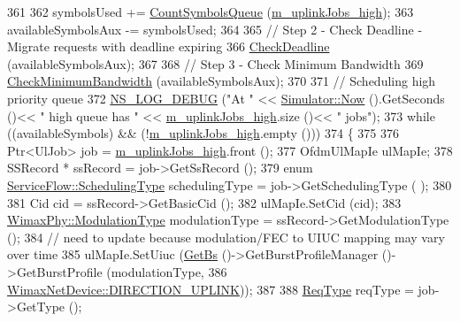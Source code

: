 \begin{DoxyCode}
361 
362   symbolsUsed += \hyperlink{classns3_1_1UplinkSchedulerMBQoS_a31659c6f3996b4a820235a4359ab2a5e}{CountSymbolsQueue} (\hyperlink{classns3_1_1UplinkSchedulerMBQoS_acb8b5539e366b4942381b08edccfba4b}{m\_uplinkJobs\_high});
363   availableSymbolsAux -= symbolsUsed;
364 
365   \textcolor{comment}{// Step 2 - Check Deadline - Migrate requests with deadline expiring}
366   \hyperlink{classns3_1_1UplinkSchedulerMBQoS_a3f8e2b0a22540ea61354cf4147187399}{CheckDeadline} (availableSymbolsAux);
367 
368   \textcolor{comment}{// Step 3 - Check Minimum Bandwidth}
369   \hyperlink{classns3_1_1UplinkSchedulerMBQoS_ae25c9cfb244144f5f9e2b7393253d009}{CheckMinimumBandwidth} (availableSymbolsAux);
370 
371   \textcolor{comment}{// Scheduling high priority queue}
372   \hyperlink{group__logging_ga413f1886406d49f59a6a0a89b77b4d0a}{NS\_LOG\_DEBUG} (\textcolor{stringliteral}{"At "} << \hyperlink{classns3_1_1Simulator_ac3178fa975b419f7875e7105be122800}{Simulator::Now} ().GetSeconds ()<< \textcolor{stringliteral}{" high queue has "} << 
      \hyperlink{classns3_1_1UplinkSchedulerMBQoS_acb8b5539e366b4942381b08edccfba4b}{m\_uplinkJobs\_high}.size ()<< \textcolor{stringliteral}{" jobs"});
373   \textcolor{keywordflow}{while} ((availableSymbols) && (!\hyperlink{classns3_1_1UplinkSchedulerMBQoS_acb8b5539e366b4942381b08edccfba4b}{m\_uplinkJobs\_high}.empty ()))
374     \{
375 
376       Ptr<UlJob> job = \hyperlink{classns3_1_1UplinkSchedulerMBQoS_acb8b5539e366b4942381b08edccfba4b}{m\_uplinkJobs\_high}.front ();
377       OfdmUlMapIe ulMapIe;
378       SSRecord * ssRecord = job->GetSsRecord ();
379       \textcolor{keyword}{enum} \hyperlink{classns3_1_1ServiceFlow_a7990ba10be1e098328fd1e6382a26235}{ServiceFlow::SchedulingType} schedulingType = job->GetSchedulingType (
      );
380 
381       Cid cid = ssRecord->GetBasicCid ();
382       ulMapIe.SetCid (cid);
383       \hyperlink{classns3_1_1WimaxPhy_a044c5d8a48ca992c39c2a946f6e755fa}{WimaxPhy::ModulationType} modulationType = ssRecord->GetModulationType ();
384       \textcolor{comment}{// need to update because modulation/FEC to UIUC mapping may vary over time}
385       ulMapIe.SetUiuc (\hyperlink{classns3_1_1UplinkScheduler_afe61b7de71d92d2dff1b135744a6ff7e}{GetBs} ()->GetBurstProfileManager ()->GetBurstProfile (modulationType,
386                                                                              
      \hyperlink{classns3_1_1WimaxNetDevice_a194b6cf7eb59582328eb2531dc9ed884ad37a477621d1df190ff8d8fb933349cd}{WimaxNetDevice::DIRECTION\_UPLINK}));
387 
388       \hyperlink{namespacens3_a534f9a14e4d9aeb5b400e61f152a73a2}{ReqType} reqType = job->GetType ();

\end{DoxyCode}
